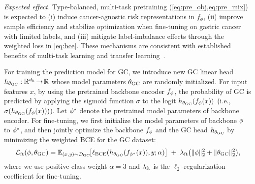 \documentclass[diagnostics,article,submit,pdftex,moreauthors]{Definitions/mdpi}
\begin{document}
\textit{Expected effect.} Type-balanced, multi-task pretraining (\cref{eq:pre_obj,eq:pre_mix}) is expected to (i) induce cancer-agnostic risk representations in $f_\phi$, (ii) improve sample efficiency and stabilize optimization when fine-tuning on gastric cancer with limited labels, and (iii) mitigate label-imbalance effects through the weighted loss in \cref{eq:bce}.
These mechanisms are consistent with established benefits of multi-task learning and transfer learning~\citep{Caruana1997_MTL,Pan2010_TLsurvey,Yosinski2014_transferable,He2009_Imbalanced}.

For training the prediction model for GC, we introduce new GC linear head $h_{\theta_{\mathrm{GC}}}:\mathbb{R}^{d_{h}}\!\to\!\mathbb{R}$ whose model parameters $\theta_{\mathrm{GC}}$ are randomly initialized.
For input features $x$, by using the pretrained backbone encoder $f_{\phi}$, the probability of GC is predicted by applying the sigmoid function $\sigma$ to the logit $h_{\theta_{\mathrm{GC}}}(f_{\phi}(x))$ (i.e., $\sigma(h_{\theta_{\mathrm{GC}}}(f_{\phi}(x)))$).
Let $\phi^\star$ denote the pretrained model parameters of backbone encoder.
For fine-tuning, we first initialize the model parameters of backbone $\phi$ to $\phi^\star$, and then jointly optimize the backbone $f_{\phi}$ and the GC head $h_{\theta_{\mathrm{GC}}}$ by minimizing the weighted BCE for the GC dataset:
\begin{equation}
\label{eq:ft_obj}
\mathcal{L}_{\mathrm{ft}}(\phi,\theta_{\mathrm{GC}}) = \mathbb{E}_{(x,y)\sim \mathcal{D}_{\mathrm{GC}}}\!\big[\ell_{\mathrm{BCE}}(h_{\theta_{\mathrm{GC}}}(f_{\phi^\star}(x)),y;\alpha)\big]\;+\;\lambda_{\mathrm{ft}} \big( \|\phi\|_2^2 + \|\theta_{\mathrm{GC}}\|_2^2 \big),
\end{equation}
where we use positive-class weight $\alpha{=}3$ and $\lambda_{\mathrm{ft}}$ is the $\ell_2$-regularization coefficient for fine-tuning.


\end{document}

